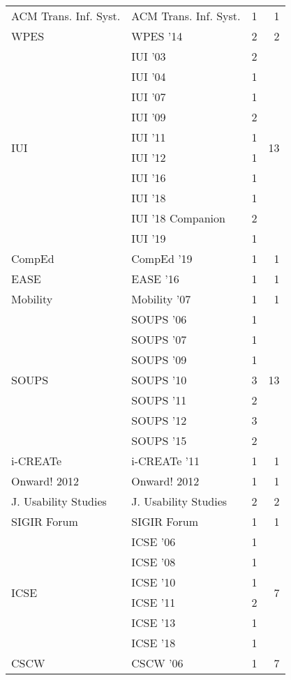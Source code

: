 \begin{table*}[t]
\begin{tabular}{llrr}
\multirow{1}{*}{ACM Trans. Inf. Syst.} & ACM Trans. Inf. Syst. & 1 & \multirow{1}{*}{1}\\
\multirow{1}{*}{WPES } & WPES '14 & 2 & \multirow{1}{*}{2}\\
\multirow{10}{*}{IUI } & IUI '03 & 2 & \multirow{10}{*}{13}\\
& IUI '04 & 1 &\\
& IUI '07 & 1 &\\
& IUI '09 & 2 &\\
& IUI '11 & 1 &\\
& IUI '12 & 1 &\\
& IUI '16 & 1 &\\
& IUI '18 & 1 &\\
& IUI '18 Companion & 2 &\\
& IUI '19 & 1 &\\
\multirow{1}{*}{CompEd } & CompEd '19 & 1 & \multirow{1}{*}{1}\\
\multirow{1}{*}{EASE } & EASE '16 & 1 & \multirow{1}{*}{1}\\
\multirow{1}{*}{Mobility } & Mobility '07 & 1 & \multirow{1}{*}{1}\\
\multirow{7}{*}{SOUPS } & SOUPS '06 & 1 & \multirow{7}{*}{13}\\
& SOUPS '07 & 1 &\\
& SOUPS '09 & 1 &\\
& SOUPS '10 & 3 &\\
& SOUPS '11 & 2 &\\
& SOUPS '12 & 3 &\\
& SOUPS '15 & 2 &\\
\multirow{1}{*}{i-CREATe } & i-CREATe '11 & 1 & \multirow{1}{*}{1}\\
\multirow{1}{*}{Onward! 2012} & Onward! 2012 & 1 & \multirow{1}{*}{1}\\
\multirow{1}{*}{J. Usability Studies} & J. Usability Studies & 2 & \multirow{1}{*}{2}\\
\multirow{1}{*}{SIGIR Forum} & SIGIR Forum & 1 & \multirow{1}{*}{1}\\
\multirow{6}{*}{ICSE } & ICSE '06 & 1 & \multirow{6}{*}{7}\\
& ICSE '08 & 1 &\\
& ICSE '10 & 1 &\\
& ICSE '11 & 2 &\\
& ICSE '13 & 1 &\\
& ICSE '18 & 1 &\\
\multirow{7}{*}{CSCW } & CSCW '06 & 1 & \multirow{7}{*}{7}\\

\end{tabular}
\end{table*}
